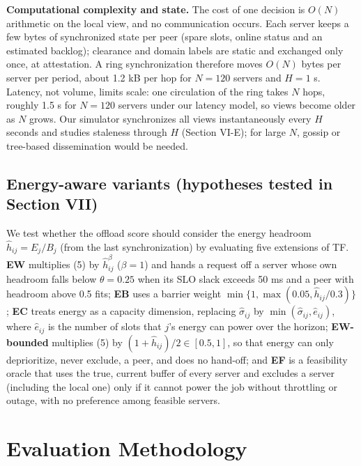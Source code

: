 \documentclass[journal]{IEEEtran}
\begin{document}
\textbf{Computational complexity and state.} The cost of one decision is \(O(N)\) arithmetic on the local view, and no communication occurs. Each server keeps a few bytes of synchronized state per peer (spare slots, online status and an estimated backlog); clearance and domain labels are static and exchanged only once, at attestation. A ring synchronization therefore moves \(O(N)\) bytes per server per period, about 1.2 kB per hop for \(N=120\) servers and \(H=1\) s. Latency, not volume, limits scale: one circulation of the ring takes \(N\) hops, roughly 1.5 s for \(N=120\) servers under our latency model, so views become older as \(N\) grows. Our simulator synchronizes all views instantaneously every \(H\) seconds and studies staleness through \(H\) (Section VI-E); for large \(N\), gossip or tree-based dissemination would be needed.

\subsection{Energy-aware variants (hypotheses tested in Section VII)}

We test whether the offload score should consider the energy headroom \(\hat h_{ij}=E_j/B_j\) (from the last synchronization) by evaluating five extensions of TF. \textbf{EW} multiplies (5) by \(\hat h_{ij}^{\beta}\) (\(\beta=1\)) and hands a request off a server whose own headroom falls below \(\theta=0.25\) when its SLO slack exceeds 50 ms and a peer with headroom above 0.5 fits; \textbf{EB} uses a barrier weight \(\min\{1,\max(0.05,\hat h_{ij}/0.3)\}\); \textbf{EC} treats energy as a capacity dimension, replacing \(\hat\sigma_{ij}\) by \(\min(\hat\sigma_{ij},\hat e_{ij})\), where \(\hat e_{ij}\) is the number of slots that \(j\)'s energy can power over the horizon; \textbf{EW-bounded} multiplies (5) by \((1+\hat h_{ij})/2\in[0.5,1]\), so that energy can only deprioritize, never exclude, a peer, and does no hand-off; and \textbf{EF} is a feasibility oracle that uses the true, current buffer of every server and excludes a server (including the local one) only if it cannot power the job without throttling or outage, with no preference among feasible servers.

\section{Evaluation Methodology}
\end{document}
